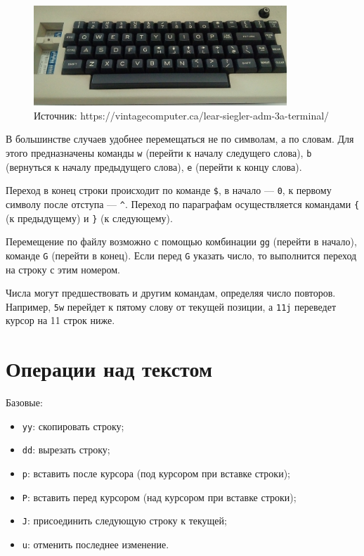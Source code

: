 \documentclass[listings]{labreport}
\begin{document}
\begin{figure}[H]
  \begin{center}
  \includegraphics[width=0.85\textwidth, bb=0 0 1366 540]{vintagecomputer.ca-ADM3A.jpg}
  \captionsetup{labelformat=empty}
  \caption{\scriptsize Источник: https://vintagecomputer.ca/lear-siegler-adm-3a-terminal/}
  \end{center}
\end{figure}

В большинстве случаев удобнее перемещаться не по символам, а по словам. Для этого предназначены
команды \texttt{w} (перейти к началу следущего слова), \texttt{b} (вернуться к началу
предыдущего слова), \texttt{e} (перейти к концу слова).

Переход в конец строки происходит по команде \texttt{\$}, в начало — \texttt{0},
к первому символу после отступа — \texttt{\^{}}. Переход по параграфам осуществляется
командами \texttt{\{} (к предыдущему) и \texttt{\}} (к следующему).

Перемещение по файлу возможно с помощью комбинации \texttt{gg} (перейти в начало), команде
\texttt{G} (перейти в конец). Если перед \texttt{G} указать число, то выполнится переход на строку
с этим номером.

Числа могут предшествовать и другим командам, определяя число повторов. Например, \texttt{5w} перейдет
к пятому слову от текущей позиции, а \texttt{11j} переведет курсор на 11 строк ниже.

\section*{Операции над текстом}

Базовые:
\begin{itemize}
\item \texttt{yy}: скопировать строку;
\item \texttt{dd}: вырезать строку;
\item \texttt{p}: вставить после курсора (под курсором при вставке строки);
\item \texttt{P}: вставить перед курсором (над курсором при вставке строки);
\item \texttt{J}: присоединить следующую строку к текущей;
\item \texttt{u}: отменить последнее изменение.
\end{itemize}
\end{document}
